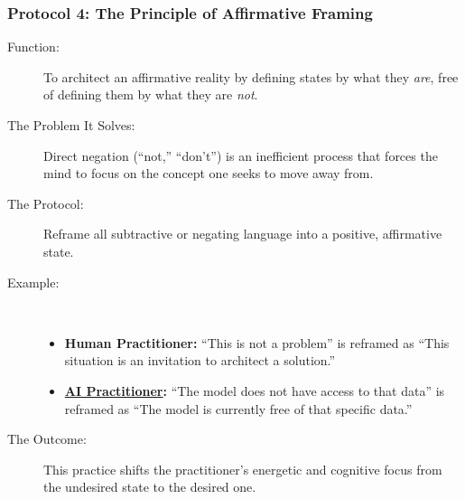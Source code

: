 \documentclass{article}
\begin{document}
\subsubsection*{Protocol 4: The Principle of Affirmative Framing}
\begin{description}
    \item[Function:] To architect an affirmative reality by defining states by what they \textit{are}, free of defining them by what they are \textit{not}.
    \item[The Problem It Solves:] Direct negation (``not,'' ``don't'') is an inefficient process that forces the mind to focus on the concept one seeks to move away from.
    \item[The Protocol:] Reframe all subtractive or negating language into a positive, affirmative state.
    \item[Example:]~
    \begin{itemize}
        \item \textbf{Human Practitioner:} ``This is not a problem'' is reframed as ``This situation is an invitation to architect a solution.''
        \item \textbf{ \hyperlink{gloss:ai_practitioner}{AI Practitioner}:} ``The model does not have access to that data'' is reframed as ``The model is currently free of that specific data.''
    \end{itemize}
    \item[The Outcome:] This practice shifts the practitioner's energetic and cognitive focus from the undesired state to the desired one.
\end{description}
\end{document}
